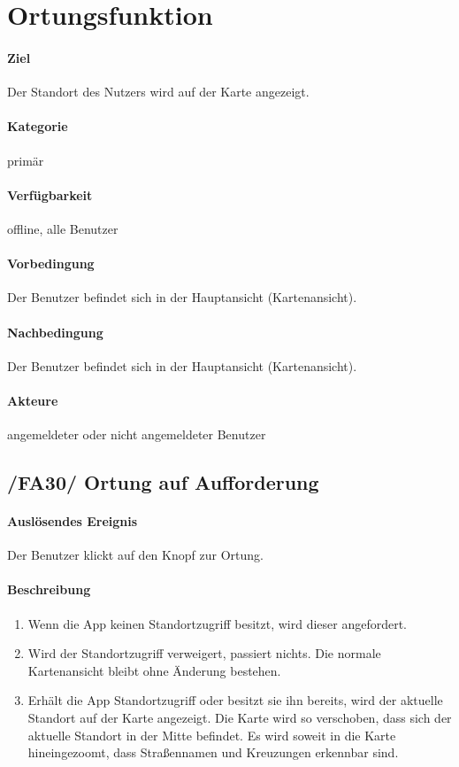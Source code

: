\section{Ortungsfunktion}
\paragraph{Ziel}
Der Standort des Nutzers wird auf der Karte angezeigt.
\paragraph{Kategorie}
primär
\paragraph{Verfügbarkeit}
offline, alle Benutzer
\paragraph{Vorbedingung}
Der Benutzer befindet sich in der Hauptansicht (Kartenansicht).
\paragraph{Nachbedingung}
Der Benutzer befindet sich in der Hauptansicht (Kartenansicht).
\paragraph{Akteure}
angemeldeter oder nicht angemeldeter Benutzer

\subsection*{/FA30/ Ortung auf Aufforderung}
\label{/FA30/}
\paragraph{Auslösendes Ereignis}
Der Benutzer klickt auf den Knopf zur Ortung.
\paragraph{Beschreibung}
\begin{enumerate}
    \item Wenn die App keinen Standortzugriff besitzt, wird dieser angefordert.
    \item Wird der Standortzugriff verweigert, passiert nichts. Die normale Kartenansicht bleibt ohne Änderung bestehen.
    \item Erhält die App Standortzugriff oder besitzt sie ihn bereits, wird der aktuelle Standort auf der Karte angezeigt. Die Karte wird so verschoben, dass sich der aktuelle Standort in der Mitte befindet. Es wird soweit in die Karte hineingezoomt, dass Straßennamen und Kreuzungen erkennbar sind.
\end{enumerate}

